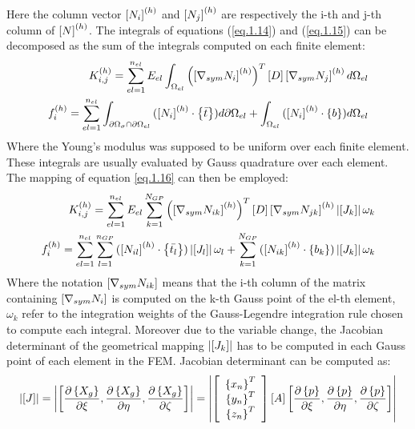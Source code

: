 Here the column vector $\left[{N_i}\right]^{(h)}$ and $\left[{N_j}\right]^{(h)}$ are respectively the i-th and j-th column of $\left[{N}\right]^{(h)}$.
The integrals of equations (\ref{eq.1.14}) and (\ref{eq.1.15}) can be decomposed as the sum of the integrals computed on each finite element: 
\begin{eqnarray}
{K}_{i,j}^{(h)}=\sum_{el=1}^{n_{el}}E_{el}\int_{\Omega_{el}}{\left(\left[{\nabla_{sym}N_i}\right]^{(h)}\right)^T \left[{D}\right]\left[{\nabla_{sym}N_j}\right]^{(h)}   d\Omega_{el}}\\
{f}_{i}^{(h)}=\sum_{el=1}^{n_{el}}\int_{\partial \Omega_{\sigma}\cap\partial \Omega_{el} }{(\left[{N_i}\right]^{(h)} \cdot \left\lbrace{\bar{t}}\right \rbrace )d\partial \Omega_{el}}+\int_{\Omega_{el}}{(\left[{N_i}\right]^{(h)}\cdot \left\lbrace{b}\right \rbrace) d\Omega_{el}}
\end{eqnarray}
Where the Young's modulus was supposed to be uniform over each finite element.
 These integrals are usually evaluated by Gauss quadrature over each element.
The mapping of equation \ref{eq.1.16} can then be employed:
 \begin{eqnarray}
 {K}_{i,j}^{(h)}=\sum_{el=1}^{n_{el}}E_{el}\sum_{k=1}^{N_{GP}}{\left(\left[{\nabla_{sym}N_{ik}}\right]^{(h)}\right)^T \left[{D}\right]\left[{\nabla_{sym}N_{jk}}\right]^{(h)}\left|{\left[{J_k}\right]}\right|\omega_k}\\
 {f}_{i}^{(h)}=\sum_{el=1}^{n_{el}}\sum_{l=1}^{n_{GP}} {(\left[{N_{il}}\right]^{(h)} \cdot \left\lbrace{\bar{t_l}}\right \rbrace )\left|{\left[{J_l}\right]}\right|\omega_l}+\sum_{k=1}^{N_{GP}}{(\left[{N_{ik}}\right]^{(h)}\cdot \left\lbrace{b_k}\right \rbrace) \left|{\left[{J_k}\right]}\right|\omega_k}
 \end{eqnarray}
Where the notation $\left[{\nabla_{sym}N_{ik}}\right]$ means that the i-th column of the matrix containing $\left[{\nabla_{sym}N_{i}}\right]$ is computed on the k-th Gauss point of the el-th element, $\omega_k$ refer to the integration weights of the Gauss-Legendre integration rule chosen to compute each integral. Moreover due to the variable change, the Jacobian determinant of the geometrical mapping $\left|{\left[{J_k}\right]}\right|$ has to be computed in each Gauss point of each element in the FEM.
Jacobian determinant can be computed as:
\begin{equation}
\left|{\left[{J}\right]}\right| =\left|{\left[{\frac{\partial \left\lbrace{X_g}\right \rbrace}{\partial \xi},\frac{\partial \left\lbrace{X_g}\right \rbrace}{\partial \eta},\frac{\partial \left\lbrace{X_g}\right \rbrace}{\partial \zeta}}\right]}\right|=\left|{\left[{\begin{array}{c}\left\lbrace{x_n}\right \rbrace^T\\\left\lbrace{y_n}\right \rbrace^T\\\left\lbrace{z_n}\right \rbrace^T\end{array}}\right] \left[{A}\right]\left[{\frac{\partial \left\lbrace{p}\right \rbrace}{\partial \xi},\frac{\partial \left\lbrace{p}\right \rbrace}{\partial \eta},\frac{\partial \left\lbrace{p}\right \rbrace}{\partial \zeta}}\right]}\right| 
\end{equation}
